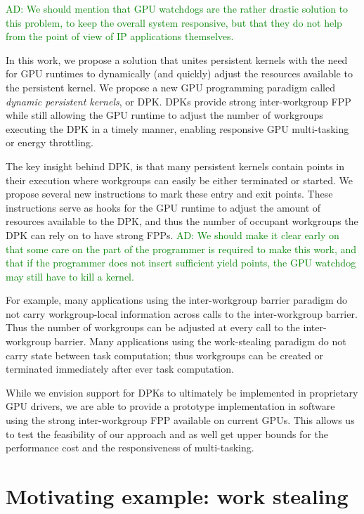 \documentclass[nocopyrightspace]{sigplanconf-pldi16}
\newcommand{\ADComment}[1]{\textcolor{green}{AD: #1}}
\begin{document}
\ADComment{We should mention that GPU watchdogs are the rather drastic solution to this problem, to keep the overall system responsive, but that they do not help from the point of view of IP applications themselves.}

In this work, we propose a solution that unites persistent kernels
with the need for GPU runtimes to dynamically (and quickly) adjust the
resources available to the persistent kernel. We propose a new GPU
programming paradigm called \emph{dynamic persistent kernels}, or
DPK. DPKs provide strong inter-workgroup FPP while still allowing the
GPU runtime to adjust the number of workgroups executing the DPK in a
timely manner, enabling responsive GPU multi-tasking or energy
throttling.

The key insight behind DPK, is that many persistent kernels contain
points in their execution where workgroups can easily be either
terminated or started. We propose several new instructions to mark
these entry and exit points. These instructions serve as hooks for the
GPU runtime to adjust the amount of resources available to the DPK,
and thus the number of occupant workgroups the DPK can rely on to have
strong FPPs. \ADComment{We should make it clear early on that some care on the part of the programmer is required to make this work, and that if the programmer does not insert sufficient yield points, the GPU watchdog may still have to kill a kernel.}

For example, many applications using the inter-workgroup barrier
paradigm do not carry workgroup-local information across calls to the
inter-workgroup barrier. Thus the number of workgroups can be adjusted
at every call to the inter-workgroup barrier. Many applications using
the work-stealing paradigm do not carry state between task
computation; thus workgroups can be created or terminated immediately
after ever task computation.

While we envision support for DPKs to ultimately be implemented in
proprietary GPU drivers, we are able to provide a prototype
implementation in software using the strong inter-workgroup FPP
available on current GPUs. This allows us to test the feasibility of
our approach and as well get upper bounds for the performance cost and
the responsiveness of multi-tasking.

\section{Motivating example: work stealing}
\end{document}
